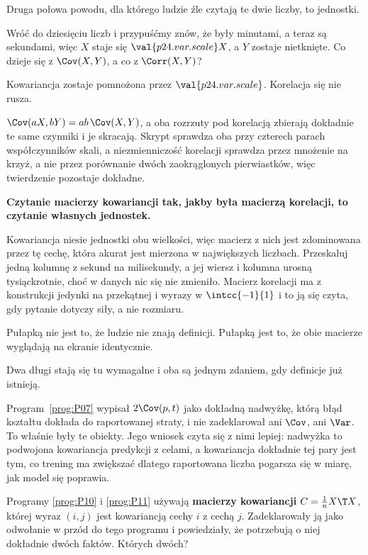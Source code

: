\begin{fr}
Druga połowa powodu, dla którego ludzie źle czytają te dwie liczby, to
jednostki.

Wróć do dziesięciu liczb i przypuśćmy znów, że były minutami, a teraz są
sekundami, więc $X$ staje się $\val{p24.var.scale}X$, a $Y$ zostaje nietknięte.
Co dzieje się z $\Cov(X, Y)$, a co z $\Corr(X, Y)$?
\dotline
\nextframe
\end{fr}

\begin{fr}
\begin{ansblock}
Kowariancja zostaje pomnożona przez $\val{p24.var.scale}$. Korelacja się nie
rusza.
\end{ansblock}

$\Cov(aX, bY) = ab\,\Cov(X, Y)$, a oba rozrzuty pod korelacją zbierają
dokładnie te same czynniki i je skracają. Skrypt sprawdza oba przy czterech
parach współczynników skali, a niezmienniczość korelacji sprawdza przez
mnożenie na krzyż, a nie przez porównanie dwóch zaokrąglonych pierwiastków,
więc twierdzenie pozostaje dokładne.

\begin{trapbox}
\textbf{Czytanie macierzy kowariancji tak, jakby była macierzą korelacji, to
czytanie własnych jednostek.}

Kowariancja niesie jednostki obu wielkości, więc macierz z nich jest
zdominowana przez tę cechę, która akurat jest mierzona w największych
liczbach. Przeskaluj jedną kolumnę z sekund na milisekundy, a jej wiersz i
kolumna urosną tysiąckrotnie, choć w danych nic się nie zmieniło. Macierz
korelacji ma z konstrukcji jedynki na przekątnej i wyrazy w
$\intcc{-1}{1}$ i to ją się czyta, gdy pytanie dotyczy siły, a nie rozmiaru.

Pułapką nie jest to, że ludzie nie znają definicji. Pułapką jest to, że obie
macierze wyglądają na ekranie identycznie.
\end{trapbox}
\end{fr}

\begin{fr}
Dwa długi stają się tu wymagalne i oba są jednym zdaniem, gdy definicje już
istnieją.

Program~\ref{prog:P07} wypisał $2\Cov(p, t)$ jako dokładną nadwyżkę, którą
błąd kształtu dokłada do raportowanej straty, i nie zadeklarował ani $\Cov$,
ani $\Var$. To właśnie były te obiekty. Jego wniosek czyta się z nimi lepiej:
nadwyżka to podwojona kowariancja predykcji z celami, a kowariancja dokładnie
tej pary jest tym, co trening ma zwiększać \dash{} dlatego raportowana liczba
pogarsza się w miarę, jak model się poprawia.

Programy \ref{prog:P10} i \ref{prog:P11} używają \textbf{macierzy
kowariancji} $C = \frac{1}{n}X\T X$, której wyraz $(i, j)$ jest kowariancją
cechy $i$ z cechą $j$. Zadeklarowały ją jako odwołanie w przód do tego
programu i powiedziały, że potrzebują o niej dokładnie dwóch faktów. Których
dwóch?
\dotline
\nextframe
\end{fr}

